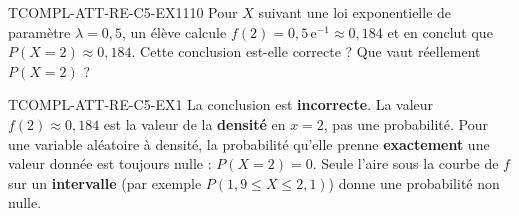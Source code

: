 

\begin{exercice}{TCOMPL-ATT-RE-C5-EX1}{1}{10}
Pour $X$ suivant une loi exponentielle de paramètre $\lambda=0{,}5$, un élève calcule $f(2) = 0{,}5\,\mathrm{e}^{-1} \approx 0{,}184$ et en conclut que $P(X=2) \approx 0{,}184$. Cette conclusion est-elle correcte ? Que vaut réellement $P(X=2)$ ?
\end{exercice}


\begin{corrige}{TCOMPL-ATT-RE-C5-EX1}
La conclusion est \textbf{incorrecte}. La valeur $f(2)\approx0{,}184$ est la valeur de la \textbf{densité} en $x=2$, pas une probabilité. Pour une variable aléatoire à densité, la probabilité qu'elle prenne \textbf{exactement} une valeur donnée est toujours nulle : $P(X=2)=0$. Seule l'aire sous la courbe de $f$ sur un \textbf{intervalle} (par exemple $P(1{,}9\leq X\leq2{,}1)$) donne une probabilité non nulle.
\end{corrige}
